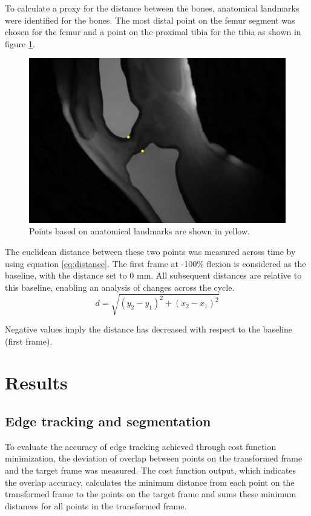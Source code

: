 \documentclass{micro-econ-thesis}
\begin{document}
To calculate a proxy for the distance between the bones, anatomical landmarks were identified for the bones. The most distal point on the femur segment was chosen for the femur and a point on the proximal tibia for the tibia as shown in figure \ref{fig:twopoints}.   
\begin{figure}[H]
	\centering
	\includegraphics[width=0.7\linewidth]{two_points}
	\caption{Points based on anatomical landmarks are shown in yellow.}
	\label{fig:twopoints}
\end{figure}

The euclidean distance between these two points was measured across time by using equation \ref{eq:distance}. The first frame at -100\% flexion is considered as the baseline, with the distance set to 0 mm. All subsequent distances are relative to this baseline, enabling an analysis of changes across the cycle. 
\begin{equation}
	d = \sqrt{(y_2 - y_1)^2 + (x_2 - x_1)^2}
	\label{eq:distance}
\end{equation} 

Negative values imply the distance has decreased with respect to the baseline (first frame). 

\section{Results}
\label{sec:yetanother}

\subsection{Edge tracking and segmentation}

To evaluate the accuracy of edge tracking achieved through cost function minimization, the deviation of overlap between points on the transformed frame and the target frame was measured. The cost function output, which indicates the overlap accuracy, calculates the minimum distance from each point on the transformed frame to the points on the target frame and sums these minimum distances for all points in the transformed frame.
\end{document}
